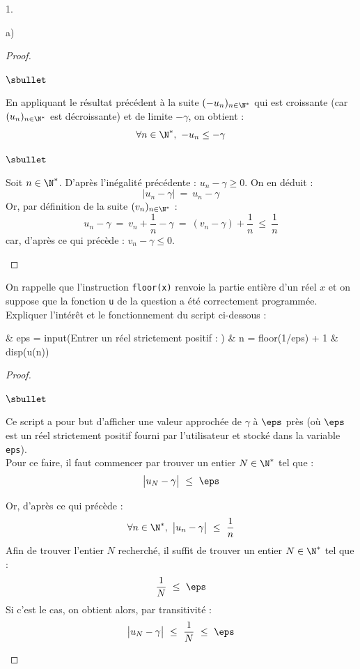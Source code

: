 \documentclass[11pt]{article}%
\begin{document}
\begin{noliste}{1.}
\begin{noliste}{a)}
\begin{proof}
\begin{noliste}{$\sbullet$}
      \item En appliquant le résultat précédent à la suite $(-u_n)_{n
          \in \N^*}$ qui est croissante (car $(u_n)_{n\in\N^*}$ est
        décroissante) et de limite $-\gamma$, on obtient :
        \[
        \forall n \in \N^*, \ -u_n \leq -\gamma
        \]
      \end{noliste}



        

        \begin{noliste}{$\sbullet$}
      \item Soit $n \in \N^*$. D'après l'inégalité précédente : $u_n -
        \gamma \geq 0$. On en déduit :
        \[
        \big| u_n - \gamma \big| \ = \ u_n - \gamma
        \]
        Or, par définition de la suite $(v_n)_{n \in \N^*}$ :
        \[
        u_n - \gamma \ = \ v_n + \dfrac{1}{n} - \gamma \ = \ \left(v_n
          - \gamma \right) + \dfrac{1}{n} \ \leq \ \dfrac{1}{n}
        \]
        car, d'après ce qui précède : $v_n - \gamma \leq 0$.%
        ~\\[-1.4cm]
      \end{noliste}
    \end{proof}

  \item On rappelle que l'instruction {\tt floor(x)} renvoie la partie
    entière d'un réel $x$ et on suppose que la fonction {\tt u} de la
    question \itbf{1.e)} a été correctement programmée. Expliquer
    l'intérêt et le fonctionnement du script ci-dessous :
    \begin{scilab}
      & eps = input(\ttq{}Entrer un réel strictement positif : \ttq{})
      \nl %
      & n = floor(1/eps) + 1 \nl %
      & disp(u(n))
    \end{scilab}

    \begin{proof}~%
      \begin{noliste}{$\sbullet$}
      \item Ce script a pour but d'afficher une valeur approchée de
        $\gamma$ à $\eps$ près (où $\eps$ est un réel strictement
        positif fourni par l'utilisateur et stocké dans la variable
        {\tt eps}).\\
        Pour ce faire, il faut commencer par trouver un entier $N \in
        \N^*$ tel que :
        \[
        \big| u_N - \gamma \big| \ \leq \ \eps
        \]
      \item Or, d'après ce qui précède : 
        \[
        \forall n \in \N^*, \ \big| u_n - \gamma \big| \ \leq \
        \dfrac{1}{n}
        \]
        Afin de trouver l'entier $N$ recherché, il suffit de trouver
        un entier $N \in \N^*$ tel que :
        \[
        \dfrac{1}{N} \ \leq \ \eps
        \]
        Si c'est le cas, on obtient alors, par transitivité :
        \[
        \big| u_N - \gamma \big| \ \leq \ \dfrac{1}{N} \ \leq \ \eps
        \]



\end{noliste}
\end{proof}
\end{noliste}
\end{noliste}
\end{document}
